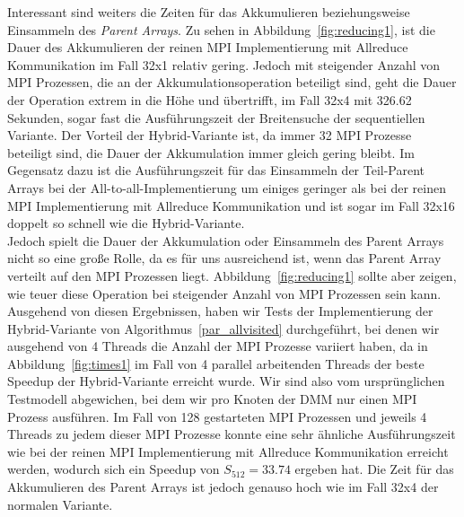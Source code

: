 \documentclass[11pt,a4paper]{article}
\begin{document}
Interessant sind weiters die Zeiten für das Akkumulieren beziehungsweise Einsammeln des \textit{Parent Arrays}. Zu sehen in Abbildung~\ref{fig:reducing1}, ist die Dauer des Akkumulieren der reinen MPI Implementierung mit Allreduce Kommunikation im Fall 32x1 relativ gering. Jedoch mit steigender Anzahl von MPI Prozessen, die an der Akkumulationsoperation beteiligt sind, geht die Dauer der Operation extrem in die Höhe und übertrifft, im Fall 32x4 mit 326.62 Sekunden, sogar fast die Ausführungszeit der Breitensuche der sequentiellen Variante. Der Vorteil der Hybrid-Variante ist, da immer 32 MPI Prozesse beteiligt sind, die Dauer der Akkumulation immer gleich gering bleibt. Im Gegensatz dazu ist die Ausführungszeit für das Einsammeln der Teil-Parent Arrays bei der All-to-all-Implementierung um einiges geringer als bei der reinen MPI Implementierung mit Allreduce Kommunikation und ist sogar im Fall 32x16 doppelt so schnell wie die Hybrid-Variante. \\
Jedoch spielt die Dauer der Akkumulation oder Einsammeln des Parent Arrays nicht so eine große Rolle, da es für uns ausreichend ist, wenn das Parent Array verteilt auf den MPI Prozessen liegt. Abbildung~\ref{fig:reducing1} sollte aber zeigen, wie teuer diese Operation bei steigender Anzahl von MPI Prozessen sein kann. Ausgehend von diesen Ergebnissen, haben wir Tests der Implementierung der Hybrid-Variante von Algorithmus~\ref{par_allvisited} durchgeführt, bei denen wir ausgehend von 4 Threads die Anzahl der MPI Prozesse variiert haben, da in Abbildung~\ref{fig:times1} im Fall von 4 parallel arbeitenden Threads der beste Speedup der Hybrid-Variante erreicht wurde. Wir sind also vom ursprünglichen Testmodell abgewichen, bei dem wir pro Knoten der DMM nur einen MPI Prozess ausführen. Im Fall von 128 gestarteten MPI Prozessen und jeweils 4 Threads zu jedem dieser MPI Prozesse konnte eine sehr ähnliche Ausführungszeit wie bei der reinen MPI Implementierung mit Allreduce Kommunikation erreicht werden, wodurch sich ein Speedup von \(S_{512} = 33.74\) ergeben hat. Die Zeit für das Akkumulieren des Parent Arrays ist jedoch genauso hoch wie im Fall 32x4 der normalen Variante.\\
\end{document}
